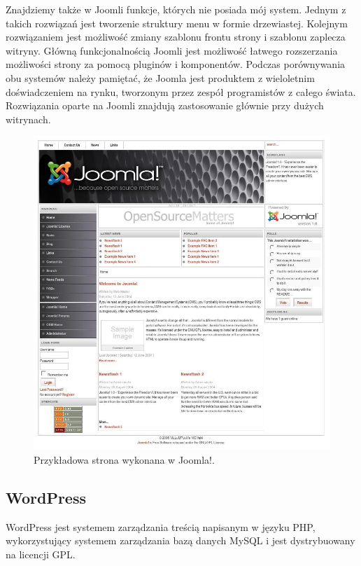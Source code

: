 \documentclass[openright]{xmgr}
\begin{document}
Znajdziemy także w Joomli funkcje, których nie posiada mój system. Jednym z takich rozwiązań jest tworzenie struktury menu w formie drzewiastej. Kolejnym rozwiązaniem jest możliwość zmiany szablonu frontu strony i szablonu zaplecza witryny. Główną funkcjonalnością Joomli jest możliwość łatwego rozszerzania możliwości strony za pomocą pluginów i komponentów. Podczas porównywania obu systemów należy pamiętać, że Joomla jest produktem z wieloletnim doświadczeniem na rynku, tworzonym przez zespół programistów z całego świata. Rozwiązania oparte na Joomli znajdują zastosowanie głównie przy dużych witrynach.

\newpage

\begin{figure}[!tbh]
\centering
\includegraphics[width=\linewidth]{fig/joomla}
\caption{Przykładowa strona wykonana w Joomla!.}
\end{figure}

\newpage

\subsection{WordPress}

WordPress jest systemem zarządzania treścią napisanym w języku PHP, wykorzystujący systemem zarządzania bazą danych MySQL i jest dystrybuowany na licencji GPL. 
\end{document}
